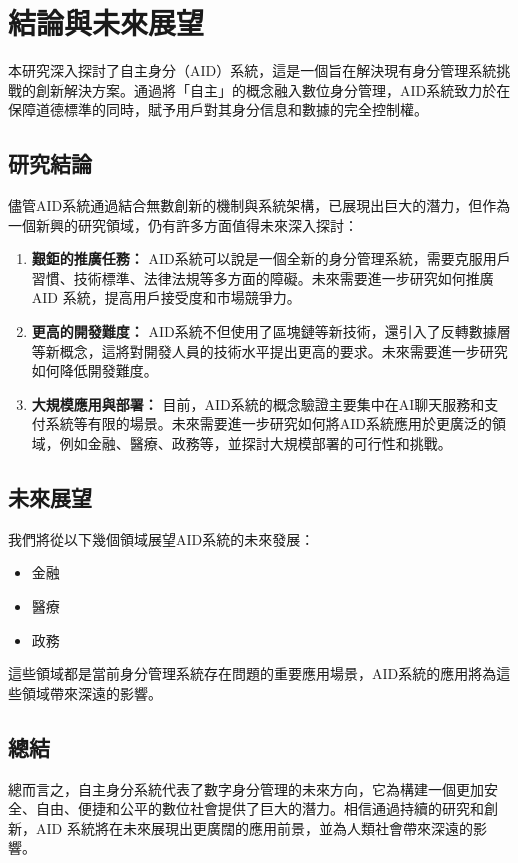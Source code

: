 
\chapter{結論與未來展望}
本研究深入探討了自主身分（AID）系統，這是一個旨在解決現有身分管理系統挑戰的創新解決方案。通過將「自主」的概念融入數位身分管理，AID系統致力於在保障道德標準的同時，賦予用戶對其身分信息和數據的完全控制權。
\section{研究結論}
儘管AID系統通過結合無數創新的機制與系統架構，已展現出巨大的潛力，但作為一個新興的研究領域，仍有許多方面值得未來深入探討：
\begin{enumerate}
    \item \textbf{艱鉅的推廣任務：} AID系統可以說是一個全新的身分管理系統，需要克服用戶習慣、技術標準、法律法規等多方面的障礙。未來需要進一步研究如何推廣 AID 系統，提高用戶接受度和市場競爭力。
    \item \textbf{更高的開發難度：} AID系統不但使用了區塊鏈等新技術，還引入了反轉數據層等新概念，這將對開發人員的技術水平提出更高的要求。未來需要進一步研究如何降低開發難度。
    \item \textbf{大規模應用與部署：} 目前，AID系統的概念驗證主要集中在AI聊天服務和支付系統等有限的場景。未來需要進一步研究如何將AID系統應用於更廣泛的領域，例如金融、醫療、政務等，並探討大規模部署的可行性和挑戰。
\end{enumerate}
\section{未來展望}
我們將從以下幾個領域展望AID系統的未來發展：
\begin{itemize}
    \item 金融
    \item 醫療
    \item 政務
\end{itemize}
這些領域都是當前身分管理系統存在問題的重要應用場景，AID系統的應用將為這些領域帶來深遠的影響。
\section{總結}
總而言之，自主身分系統代表了數字身分管理的未來方向，它為構建一個更加安全、自由、便捷和公平的數位社會提供了巨大的潛力。相信通過持續的研究和創新，AID 系統將在未來展現出更廣闊的應用前景，並為人類社會帶來深遠的影響。
